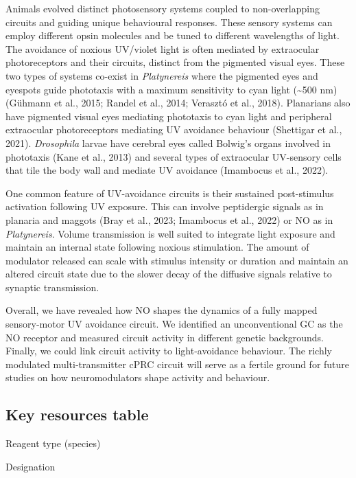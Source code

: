 \documentclass[
  10pt,
  onecolumn]{article}
\begin{document}
Animals evolved distinct photosensory systems coupled to non-overlapping
circuits and guiding unique behavioural responses. These sensory systems
can employ different opsin molecules and be tuned to different
wavelengths of light. The avoidance of noxious UV/violet light is often
mediated by extraocular photoreceptors and their circuits, distinct from
the pigmented visual eyes. These two types of systems co-exist in
\emph{Platynereis} where the pigmented eyes and eyespots guide
phototaxis with a maximum sensitivity to cyan light (\textasciitilde500
nm) (Gühmann et al., 2015; Randel et al., 2014; Verasztó et al., 2018).
Planarians also have pigmented visual eyes mediating phototaxis to cyan
light and peripheral extraocular photoreceptors mediating UV avoidance
behaviour (Shettigar et al., 2021). \emph{Drosophila} larvae have
cerebral eyes called Bolwig's organs involved in phototaxis (Kane et
al., 2013) and several types of extraocular UV-sensory cells that tile
the body wall and mediate UV avoidance (Imambocus et al., 2022).

One common feature of UV-avoidance circuits is their sustained
post-stimulus activation following UV exposure. This can involve
peptidergic signals as in planaria and maggots (Bray et al., 2023;
Imambocus et al., 2022) or NO as in \emph{Platynereis}. Volume
transmission is well suited to integrate light exposure and maintain an
internal state following noxious stimulation. The amount of modulator
released can scale with stimulus intensity or duration and maintain an
altered circuit state due to the slower decay of the diffusive signals
relative to synaptic transmission.

Overall, we have revealed how NO shapes the dynamics of a fully mapped
sensory-motor UV avoidance circuit. We identified an unconventional GC
as the NO receptor and measured circuit activity in different genetic
backgrounds. Finally, we could link circuit activity to light-avoidance
behaviour. The richly modulated multi-transmitter cPRC circuit will
serve as a fertile ground for future studies on how neuromodulators
shape activity and behaviour.

\hypertarget{key-resources-table}{%
\subsection{Key resources table}\label{key-resources-table}}

Reagent type (species)

Designation
\end{document}
